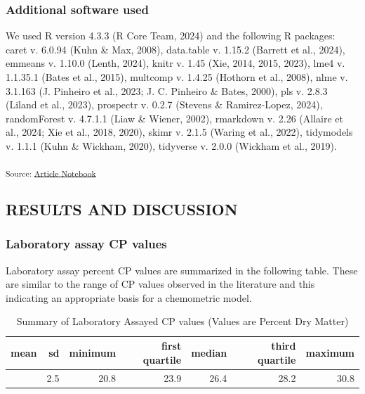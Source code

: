 \documentclass[
]{agujournal2019}
\begin{document}
\subsubsection{Additional software used}\label{additional-software-used}

We used R version 4.3.3 (R Core Team, 2024) and the following R
packages: caret v. 6.0.94 (Kuhn \& Max, 2008), data.table v. 1.15.2
(Barrett et al., 2024), emmeans v. 1.10.0 (Lenth, 2024), knitr v. 1.45
(Xie, 2014, 2015, 2023), lme4 v. 1.1.35.1 (Bates et al., 2015), multcomp
v. 1.4.25 (Hothorn et al., 2008), nlme v. 3.1.163 (J. Pinheiro et al.,
2023; J. C. Pinheiro \& Bates, 2000), pls v. 2.8.3 (Liland et al.,
2023), prospectr v. 0.2.7 (Stevens \& Ramirez-Lopez, 2024), randomForest
v. 4.7.1.1 (Liaw \& Wiener, 2002), rmarkdown v. 2.26 (Allaire et al.,
2024; Xie et al., 2018, 2020), skimr v. 2.1.5 (Waring et al., 2022),
tidymodels v. 1.1.1 (Kuhn \& Wickham, 2020), tidyverse v. 2.0.0 (Wickham
et al., 2019).

\textsubscript{Source:
\href{https://rvcrawford.github.io/glowing-system/index.qmd.html}{Article
Notebook}}

\subsection{RESULTS AND DISCUSSION}\label{results-and-discussion}

\subsubsection{Laboratory assay CP
values}\label{laboratory-assay-cp-values}

Laboratory assay percent CP values are summarized in the following
table. These are similar to the range of CP values observed in the
literature and this indicating an appropriate basis for a chemometric
model.

\begin{longtable}[]{@{}rrrrrrr@{}}

\caption{\label{tbl-lab-protein-vals}Summary of Laboratory Assayed CP
values (Values are Percent Dry Matter)}

\tabularnewline

\toprule\noalign{}
mean & sd & minimum & first quartile & median & third quartile &
maximum \\
\midrule\noalign{}
\endhead
\bottomrule\noalign{}
\endlastfoot
26.1 & 2.5 & 20.8 & 23.9 & 26.4 & 28.2 & 30.8 \\

\end{longtable}
\end{document}
